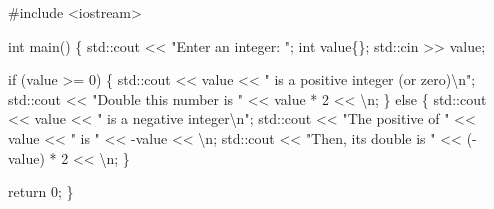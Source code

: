 \documentclass[
  letterpaper,
  DIV=11,
  numbers=noendperiod]{scrreprt}
\newenvironment{Shaded}{\begin{snugshade}}{\end{snugshade}}
\newcommand{\CommentTok}[1]{\textcolor[rgb]{0.37,0.37,0.37}{#1}}
\newcommand{\ControlFlowTok}[1]{\textcolor[rgb]{0.00,0.23,0.31}{#1}}
\newcommand{\DecValTok}[1]{\textcolor[rgb]{0.68,0.00,0.00}{#1}}
\newcommand{\ErrorTok}[1]{\textcolor[rgb]{0.68,0.00,0.00}{#1}}
\newcommand{\FunctionTok}[1]{\textcolor[rgb]{0.28,0.35,0.67}{#1}}
\newcommand{\NormalTok}[1]{\textcolor[rgb]{0.00,0.23,0.31}{#1}}
\newcommand{\SpecialCharTok}[1]{\textcolor[rgb]{0.37,0.37,0.37}{#1}}
\newcommand{\StringTok}[1]{\textcolor[rgb]{0.13,0.47,0.30}{#1}}
\begin{document}
\begin{Shaded}
\begin{Highlighting}[]
\CommentTok{\#include \textless{}iostream\textgreater{}}

\NormalTok{int }\FunctionTok{main}\NormalTok{()}
\NormalTok{\{}
\NormalTok{    std}\SpecialCharTok{::}\NormalTok{cout }\SpecialCharTok{\textless{}}\ErrorTok{\textless{}} \StringTok{"Enter an integer: "}\NormalTok{;}
\NormalTok{    int value\{\};}
\NormalTok{    std}\SpecialCharTok{::}\NormalTok{cin }\SpecialCharTok{\textgreater{}}\ErrorTok{\textgreater{}}\NormalTok{ value;}

    \ControlFlowTok{if}\NormalTok{ (value }\SpecialCharTok{\textgreater{}=} \DecValTok{0}\NormalTok{)}
\NormalTok{    \{}
\NormalTok{        std}\SpecialCharTok{::}\NormalTok{cout }\SpecialCharTok{\textless{}}\ErrorTok{\textless{}}\NormalTok{ value }\SpecialCharTok{\textless{}}\ErrorTok{\textless{}} \StringTok{" is a positive integer (or zero)}\SpecialCharTok{\textbackslash{}n}\StringTok{"}\NormalTok{;}
\NormalTok{        std}\SpecialCharTok{::}\NormalTok{cout }\SpecialCharTok{\textless{}}\ErrorTok{\textless{}} \StringTok{"Double this number is "} \SpecialCharTok{\textless{}}\ErrorTok{\textless{}}\NormalTok{ value }\SpecialCharTok{*} \DecValTok{2} \SpecialCharTok{\textless{}}\ErrorTok{\textless{}} \StringTok{\textquotesingle{}}\SpecialCharTok{\textbackslash{}n}\StringTok{\textquotesingle{}}\NormalTok{;}
\NormalTok{    \}}
    \ControlFlowTok{else}
\NormalTok{    \{}
\NormalTok{        std}\SpecialCharTok{::}\NormalTok{cout }\SpecialCharTok{\textless{}}\ErrorTok{\textless{}}\NormalTok{ value }\SpecialCharTok{\textless{}}\ErrorTok{\textless{}} \StringTok{" is a negative integer}\SpecialCharTok{\textbackslash{}n}\StringTok{"}\NormalTok{;}
\NormalTok{        std}\SpecialCharTok{::}\NormalTok{cout }\SpecialCharTok{\textless{}}\ErrorTok{\textless{}} \StringTok{"The positive of "} \SpecialCharTok{\textless{}}\ErrorTok{\textless{}}\NormalTok{ value }\SpecialCharTok{\textless{}}\ErrorTok{\textless{}} \StringTok{" is "} \SpecialCharTok{\textless{}}\ErrorTok{\textless{}} \SpecialCharTok{{-}}\NormalTok{value }\SpecialCharTok{\textless{}}\ErrorTok{\textless{}} \StringTok{\textquotesingle{}}\SpecialCharTok{\textbackslash{}n}\StringTok{\textquotesingle{}}\NormalTok{;}
\NormalTok{        std}\SpecialCharTok{::}\NormalTok{cout }\SpecialCharTok{\textless{}}\ErrorTok{\textless{}} \StringTok{"Then, its double is "} \SpecialCharTok{\textless{}}\ErrorTok{\textless{}}\NormalTok{ (}\SpecialCharTok{{-}}\NormalTok{value) }\SpecialCharTok{*} \DecValTok{2} \SpecialCharTok{\textless{}}\ErrorTok{\textless{}} \StringTok{\textquotesingle{}}\SpecialCharTok{\textbackslash{}n}\StringTok{\textquotesingle{}}\NormalTok{;}
\NormalTok{    \}}

\NormalTok{    return }\DecValTok{0}\NormalTok{;}
\NormalTok{\}}
\end{Highlighting}
\end{Shaded}
\end{document}
